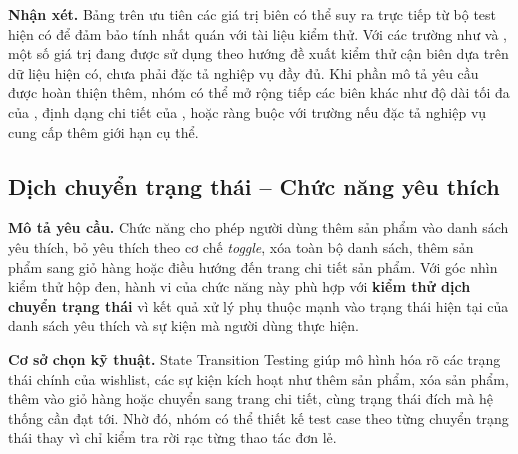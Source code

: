 \textbf{Nhận xét.} Bảng trên ưu tiên các giá trị biên có thể suy ra trực tiếp từ bộ test hiện có để đảm bảo tính nhất quán với tài liệu kiểm thử. Với các trường như  và , một số giá trị đang được sử dụng theo hướng đề xuất kiểm thử cận biên dựa trên dữ liệu hiện có, chưa phải đặc tả nghiệp vụ đầy đủ. Khi phần mô tả yêu cầu được hoàn thiện thêm, nhóm có thể mở rộng tiếp các biên khác như độ dài tối đa của , định dạng chi tiết của , hoặc ràng buộc với trường  nếu đặc tả nghiệp vụ cung cấp thêm giới hạn cụ thể.

\subsection{Dịch chuyển trạng thái -- Chức năng yêu thích}
\textbf{Mô tả yêu cầu.} Chức năng  cho phép người dùng thêm sản phẩm vào danh sách yêu thích, bỏ yêu thích theo cơ chế \textit{toggle}, xóa toàn bộ danh sách, thêm sản phẩm sang giỏ hàng hoặc điều hướng đến trang chi tiết sản phẩm. Với góc nhìn kiểm thử hộp đen, hành vi của chức năng này phù hợp với \textbf{kiểm thử dịch chuyển trạng thái} vì kết quả xử lý phụ thuộc mạnh vào trạng thái hiện tại của danh sách yêu thích và sự kiện mà người dùng thực hiện.

\textbf{Cơ sở chọn kỹ thuật.} State Transition Testing giúp mô hình hóa rõ các trạng thái chính của wishlist, các sự kiện kích hoạt như thêm sản phẩm, xóa sản phẩm, thêm vào giỏ hàng hoặc chuyển sang trang chi tiết, cùng trạng thái đích mà hệ thống cần đạt tới. Nhờ đó, nhóm có thể thiết kế test case theo từng chuyển trạng thái thay vì chỉ kiểm tra rời rạc từng thao tác đơn lẻ.


